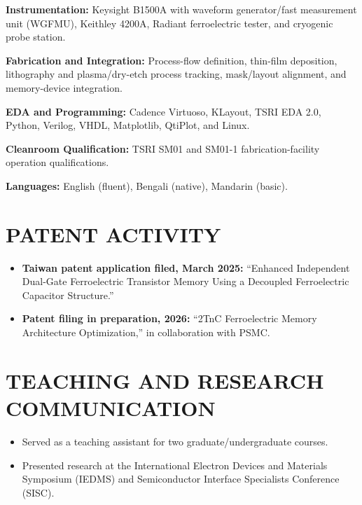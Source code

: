 \documentclass[10pt,a4paper]{article}
\begin{document}
\textbf{Instrumentation:}
Keysight B1500A with waveform generator/fast measurement unit
(WGFMU), Keithley 4200A, Radiant ferroelectric tester,
and cryogenic probe station.\par

\textbf{Fabrication and Integration:}
Process-flow definition, thin-film deposition,
lithography and plasma/dry-etch process tracking,
mask/layout alignment, and memory-device integration.\par

\textbf{EDA and Programming:}
Cadence Virtuoso, KLayout, TSRI EDA 2.0,
Python, Verilog, VHDL, Matplotlib, QtiPlot, and Linux.\par

\textbf{Cleanroom Qualification:}
TSRI SM01 and SM01-1 fabrication-facility operation
qualifications.\par

\textbf{Languages:}
English (fluent), Bengali (native), Mandarin (basic).

\section{PATENT ACTIVITY}

\begin{itemize}
  \item \textbf{Taiwan patent application filed, March 2025:}
        ``Enhanced Independent Dual-Gate Ferroelectric
        Transistor Memory Using a Decoupled Ferroelectric
        Capacitor Structure.''
  \item \textbf{Patent filing in preparation, 2026:}
        ``2TnC Ferroelectric Memory Architecture Optimization,''
        in collaboration with PSMC.
\end{itemize}

\section{TEACHING AND RESEARCH COMMUNICATION}

\begin{itemize}
  \item Served as a teaching assistant for two
        graduate/undergraduate courses.
  \item Presented research at the International Electron
        Devices and Materials Symposium (IEDMS) and
        Semiconductor Interface Specialists Conference (SISC).
\end{itemize}
\end{document}
